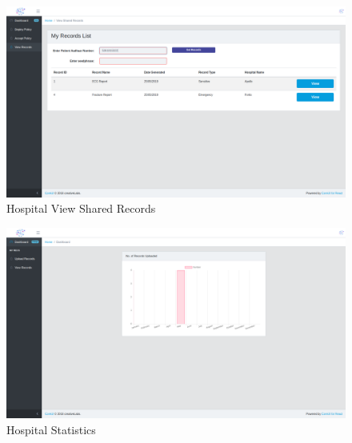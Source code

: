 \begin{figure}[!b]
	\centering
	\includegraphics[width=\linewidth]{Images/Organisation/HospitalViewSharedRecords.png}
	\caption{ Hospital View Shared Records}
\end{figure}
\begin{figure}[!b]
	\centering
	\includegraphics[width=\linewidth]{Images/Organisation/HospitalStatistics.png}
	\caption{ Hospital Statistics}
\end{figure}


